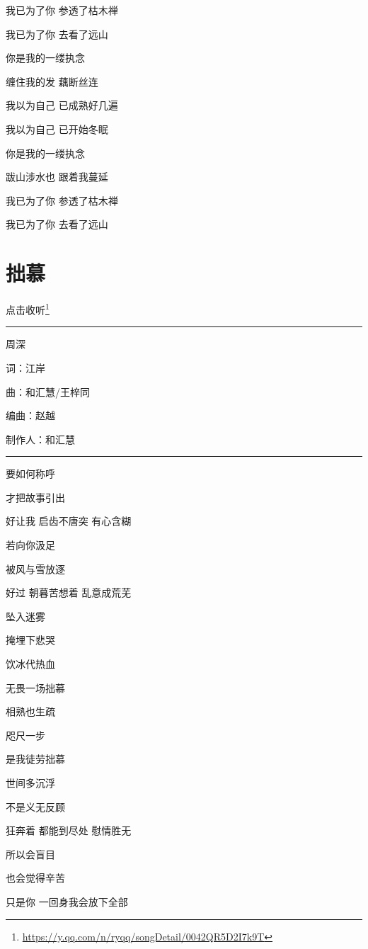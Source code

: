 \documentclass[]{ctexbook}
\renewcommand{\href}[2]{#2\footnote{\url{#1}}}
\begin{document}
我已为了你 参透了枯木禅

我已为了你 去看了远山

你是我的一缕执念

缠住我的发 藕断丝连

我以为自己 已成熟好几遍

我以为自己 已开始冬眠

你是我的一缕执念

跋山涉水也 跟着我蔓延

我已为了你 参透了枯木禅

我已为了你 去看了远山

\section*{拙慕}\label{inferior-admiration}


\href{https://y.qq.com/n/ryqq/songDetail/0042QR5D2I7k9T}{点击收听}

\begin{center}\rule{0.5\linewidth}{0.5pt}\end{center}

周深

词：江岸

曲：和汇慧/王梓同

编曲：赵越

制作人：和汇慧

\begin{center}\rule{0.5\linewidth}{0.5pt}\end{center}

要如何称呼

才把故事引出

好让我 启齿不唐突 有心含糊

若向你汲足

被风与雪放逐

好过 朝暮苦想着 乱意成荒芜

坠入迷雾

掩埋下悲哭

饮冰代热血

无畏一场拙慕

相熟也生疏

咫尺一步

是我徒劳拙慕

世间多沉浮

不是义无反顾

狂奔着 都能到尽处 慰情胜无

所以会盲目

也会觉得辛苦

只是你 一回身我会放下全部
\end{document}
